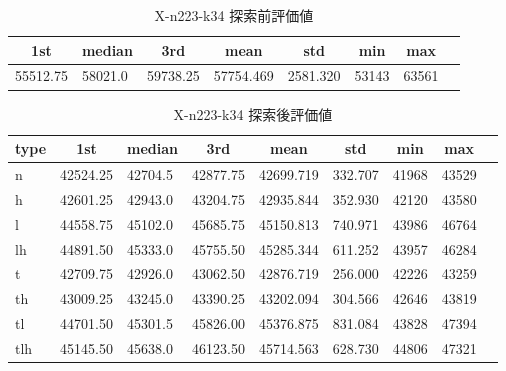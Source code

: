 \begin{table}[htbp]
    \centering
    \caption{X-n223-k34 探索前評価値}
    \begin{tabular}{|l|l|l|l|l|l|l|l|}\hline
    \multicolumn{1}{|c|}{\textbf{1st}}
    &\multicolumn{1}{c|}{\textbf{median}}
    &\multicolumn{1}{c|}{\textbf{3rd}}
    &\multicolumn{1}{c|}{\textbf{mean}}
    &\multicolumn{1}{c|}{\textbf{std}}
    &\multicolumn{1}{c|}{\textbf{min}}
    &\multicolumn{1}{c|}{\textbf{max}}\\\hline
	55512.75 & 58021.0 & 59738.25 & 57754.469 & 2581.320 & 53143 & 63561\\\hline
	\end{tabular}
\end{table}
\begin{table}[htbp]
    \centering
    \caption{X-n223-k34 探索後評価値}
    \begin{tabular}{|l|l|l|l|l|l|l|l|l|}\hline
    \multicolumn{1}{|c|}{\textbf{type}}
    &\multicolumn{1}{|c|}{\textbf{1st}}
    &\multicolumn{1}{c|}{\textbf{median}}
    &\multicolumn{1}{c|}{\textbf{3rd}}
    &\multicolumn{1}{c|}{\textbf{mean}}
    &\multicolumn{1}{c|}{\textbf{std}}
    &\multicolumn{1}{c|}{\textbf{min}}
    &\multicolumn{1}{c|}{\textbf{max}}\\\hline
	n & 42524.25 & 42704.5 & 42877.75 & 42699.719 & 332.707 & 41968 & 43529\\\hline
	h & 42601.25 & 42943.0 & 43204.75 & 42935.844 & 352.930 & 42120 & 43580\\\hline
	l & 44558.75 & 45102.0 & 45685.75 & 45150.813 & 740.971 & 43986 & 46764\\\hline
	lh & 44891.50 & 45333.0 & 45755.50 & 45285.344 & 611.252 & 43957 & 46284\\\hline
	t & 42709.75 & 42926.0 & 43062.50 & 42876.719 & 256.000 & 42226 & 43259\\\hline
	th & 43009.25 & 43245.0 & 43390.25 & 43202.094 & 304.566 & 42646 & 43819\\\hline
	tl & 44701.50 & 45301.5 & 45826.00 & 45376.875 & 831.084 & 43828 & 47394\\\hline
	tlh & 45145.50 & 45638.0 & 46123.50 & 45714.563 & 628.730 & 44806 & 47321\\\hline
	\end{tabular}
\end{table}
